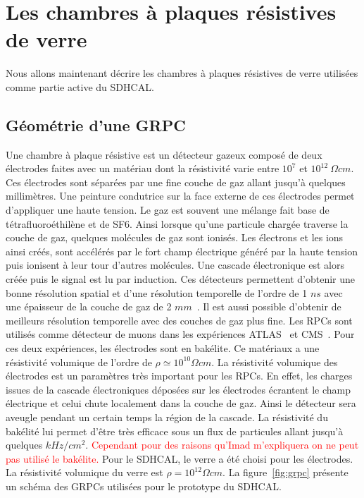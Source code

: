 \section{Les chambres à plaques résistives de verre}
Nous allons maintenant décrire les chambres à plaques résistives de verre utilisées comme partie active du SDHCAL. 
\subsection{Géométrie d'une GRPC}
Une chambre à plaque résistive est un détecteur gazeux composé de deux électrodes faites avec un matériau dont la résistivité varie entre $10^7$ et $10^{12}~\Omega cm$. Ces électrodes sont séparées par une fine couche de gaz allant jusqu'à quelques millimètres. Une peinture condutrice sur la face externe de ces électrodes permet d'appliquer une haute tension. Le gaz est souvent une mélange fait base de tétrafluoroéthilène et de SF6. Ainsi lorsque qu'une particule chargée traverse la couche de gaz, quelques molécules de gaz sont ionisés. Les électrons et les ions ainsi créés, sont accélérés par le fort champ électrique généré par la haute tension puis ionisent à leur tour d'autres molécules. Une cascade électronique est alors créée puis le signal est lu par induction. Ces détecteurs permettent d'obtenir une bonne résolution spatial et d'une résolution temporelle de l'ordre de 1 $ns$ avec une épaisseur de la couche de gaz de 2 $mm$~\cite{riegler}. Il est aussi possible d'obtenir de meilleurs résolution temporelle avec des couches de gaz plus fine. Les RPCs sont utilisés comme détecteur de muons dans les expériences ATLAS~\cite{atlas} et CMS~\cite{cms}. Pour ces deux expériences, les électrodes sont en bakélite. Ce matériaux a une résistivité volumique de l'ordre de $\rho\simeq10^{10}\Omega cm$. La résistivité volumique des électrodes est un paramètres très important pour les RPCs. En effet, les charges issues de la cascade électroniques déposées sur les électrodes écrantent le champ électrique et celui chute localement dans la couche de gaz. Ainsi le détecteur sera aveugle pendant un certain temps la région de la cascade. La résistivité du bakélité lui permet d'être très efficace sous un flux de particules allant jusqu'à quelques $kHz/cm^2$. \textcolor{red}{Cependant pour des raisons qu'Imad m'expliquera on ne peut pas utilisé le bakélite.} Pour le SDHCAL, le verre a été choisi pour les électrodes. La résistivité volumique du verre est $\rho=10^{12}\Omega cm$. La figure~\ref{fig:grpc} présente un schéma des GRPCs utilisées pour le prototype du SDHCAL. 
